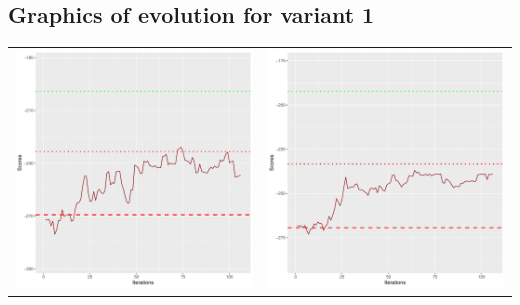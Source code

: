 \documentclass[]{scrartcl}
\begin{document}
\newpage 

\subsection{Graphics of evolution for variant 1}

\begin{table}[h!]
\begin{tabular}{cc}
\includegraphics[scale = 0.4]{./figs/asia/v1/10/boundsEvolution-107.pdf} & 
\includegraphics[scale = 0.4]{./figs/asia/v1/20/boundsEvolution-107.pdf} \\

\end{tabular}
\end{table}
\end{document}

